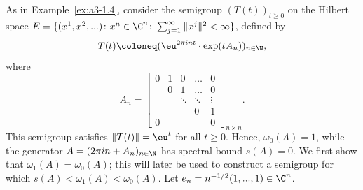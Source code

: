 \begin{example}\label{ex:a4-1.6} 
As in Example~\ref{ex:a3-1.4}, consider the semigroup $ (T(t))_{t \geq 0} $ on the Hilbert space $ E = \{(x^1, x^2, ...) \colon x^n \in \C^n\colon\sum_{j=1}^{\infty} \|x^j\|^2 < \infty\} $, defined by 
\[{
T(t) \coloneq  (\eu^{2\pi i n t} \cdot \exp(t A_n))_{n \in \N}
},\]
where
\[
A_n =
\begin{bmatrix}
0 & 1 & 0 & \dots & 0 \\
& 0 & 1 & \dots & 0 \\
& & \ddots & \ddots & \vdots \\
& & & 0 & 1 \\
0 & & & & 0
\end{bmatrix}_{n \times n}.
\]
This semigroup satisfies $ \|T(t)\| = \eu^{t} $ for all $t\ge 0$. Hence, $ \omega_{0}(A) = 1 $, while the generator $ A = (2\pi i n + A_n)_{n \in \N} $ has spectral bound $ s(A) = 0 $. 
We first show that $ \omega_1(A) = \omega_{0}(A) $; this will later be used to construct a semigroup for which $ s(A) < \omega_1(A) < \omega_{0}(A) $. 
Let $ e_n = n^{-1/2} (1, ..., 1) \in \C^n $. 
 

\end{example}
